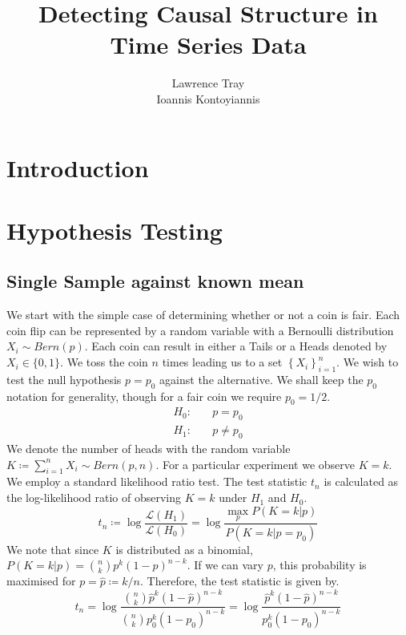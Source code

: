 \documentclass[]{article}
\title{Detecting Causal Structure in Time Series Data}
\author{Lawrence Tray \\ Ioannis Kontoyiannis}
\newcommand{\lik}{\mathcal{L}}
\begin{document}
\maketitle

\begin{abstract}
\end{abstract}

\section{Introduction}
\section{Hypothesis Testing}
\subsection{Single Sample against known mean}
We start with the simple case of determining whether or not a coin is fair. Each coin flip can be represented by a random variable with a Bernoulli distribution $X_i \sim Bern(p)$. Each coin can result in either a Tails or a Heads denoted by $X_i \in \{0, 1\}$. We toss the coin $n$ times leading us to a set $\left\{ X_i \right\}_{i=1}^{n}$. We wish to test the null hypothesis $p=p_0$ against the alternative. We shall keep the $p_0$ notation for generality, though for a fair coin we require $p_0=1/2$.
%
\begin{align*}
H_0:& \quad p = p_0 \\
H_1:& \quad p \neq p_0
\end{align*}
%
We denote the number of heads with the random variable $K \coloneqq \sum_{i=1}^{n} X_i \sim Bern(p, n)$. For a particular experiment we observe $K=k$. We employ a standard likelihood ratio test. The test statistic $t_n$ is calculated as the log-likelihood ratio of observing $K=k$ under $H_1$ and $H_0$.
%
\begin{equation}
t_n \coloneqq \log \frac{\lik(H_1)}{\lik(H_0)}
= \log \frac{\max_p P(K=k|p)}{P(K=k|p=p_0)}
\end{equation} 
%
We note that since $K$ is distributed as a binomial, $P(K=k|p)=\binom{n}{k}p^k(1-p)^{n-k}$. If we can vary $p$, this probability is maximised for $p=\hat{p} \coloneqq k/n$. Therefore, the test statistic is given by.
%
\begin{equation}
t_n = \log \frac{\binom{n}{k} \hat{p}^k (1 - \hat{p})^{n-k}}{\binom{n}{k} p_0^k (1 - p_0)^{n-k}}
=  \log \frac{ \hat{p}^k (1 - \hat{p})^{n-k}}{ p_0^k (1 - p_0)^{n-k}}
\end{equation}
\end{document}
